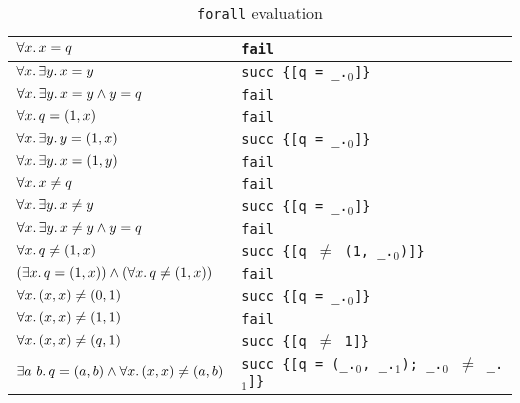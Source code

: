 \begin{table}[th]
  \centering
  \def\arraystretch{1.5}
  \begin{tabularx}{\textwidth}{|X|X|}
    \hline

    $\forall x\ldotp x = q$ & 
      \texttt{fail} \\
    \hline

    $\forall x\ldotp \exists y\ldotp x = y$ & 
      \texttt{succ \{[q = \_.$_0$]\}} \\
    \hline

    $\forall x\ldotp \exists y\ldotp x = y \wedge y = q$ &
      \texttt{fail} \\
    \hline

    $\forall x\ldotp q = (1, x)$ & 
      \texttt{fail} \\
    \hline

    $\forall x\ldotp \exists y\ldotp y = (1, x)$ & 
      \texttt{succ \{[q = \_.$_0$]\}} \\
    \hline

    $\forall x\ldotp \exists y\ldotp x = (1, y)$ &
      \texttt{fail} \\
    \hline

    $\forall x\ldotp x \neq q$ & \texttt{fail} \\
    \hline

    $\forall x\ldotp \exists y\ldotp x \neq y$ & 
      \texttt{succ \{[q = \_.$_0$]\}} \\
    \hline

    $\forall x\ldotp \exists y\ldotp x \neq y \wedge y = q$ & 
      \texttt{fail} \\
    \hline

    $\forall x\ldotp q \neq (1, x)$ & 
      \texttt{succ \{[q $\neq$ (1, \_.$_0$)]\}} \\
    \hline

    $(\exists x\ldotp q = (1, x)) \wedge (\forall x\ldotp q \neq (1, x))$ & 
      \texttt{fail} \\
    \hline

    $\forall x\ldotp (x, x) \neq (0, 1)$ & 
      \texttt{succ \{[q = \_.$_0$]\}} \\
    \hline

    $\forall x\ldotp (x, x) \neq (1, 1)$ & 
      \texttt{fail} \\
    \hline

    $\forall x\ldotp (x, x) \neq (q, 1)$ & 
      \texttt{succ \{[q $\neq$ 1]\}} \\
    \hline

    $\exists a~ b\ldotp q = (a, b) \wedge \forall x\ldotp (x, x) \neq (a, b)$ & 
      \texttt{succ \{[q = (\_.$_0$, \_.$_1$); \_.$_0$ $\neq$ \_.$_1$]\}} \\
    \hline

  \end{tabularx}
  \caption{\lstinline{forall} evaluation}
  \label{tab:univ}
\end{table}
